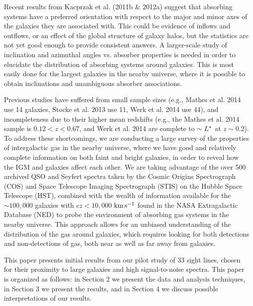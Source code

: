 \documentclass[twocolumn,tighten]{aastex6}
\begin{document}
Recent results from Kacprzak et al. (2011b $\&$ 2012a) suggest that absorbing systems have a preferred orientation with respect to the major and minor axes of the galaxies they are associated with. This could be evidence of inflows and outflows, or an effect of the global structure of galaxy halos, but the statistics are not yet good enough to provide consistent answers. A larger-scale study of inclination and azimuthal angles vs. absorber properties is needed in order to elucidate the distribution of absorbing systems around galaxies. This is most easily done for the largest galaxies in the nearby universe, where it is possible to obtain inclinations and unambiguous absorber associations. 

Previous studies have suffered from small sample sizes (e.g., Mathes et al. 2014 use 14 galaxies, Stocke et al. 2013 use 11, Werk et al. 2014 use 44), and incompleteness due to their higher mean redshifts (e.g., the Mathes et al. 2014 sample is $0.12 <z<0.67$, and Werk et al. 2014 are complete to $\sim L^{\**}$ at $z\sim0.2$). To address these shortcomings, we are conducting a large survey of the properties of intergalactic gas in the nearby universe, where we have good and relatively complete information on both faint and bright galaxies, in order to reveal how the IGM and galaxies affect each other. We are taking advantage of the over 500 archived QSO and Seyfert spectra taken by the Cosmic Origins Spectrograph (COS) and Space Telescope Imaging Spectrograph (STIS) on the Hubble Space Telescope (HST), combined with the wealth of information available for the $\sim100,000$ galaxies with $cz<10,000$ $\rm km\, s^{-1}$ found in the NASA Extragalactic Database (NED) to probe the environment of absorbing gas systems in the nearby universe. This approach allows for an unbiased understanding of the distribution of the gas around galaxies, which requires looking for both detections and non-detections of gas, both near as well as far away from galaxies.

This paper presents initial results from our pilot study of 33 sight lines, chosen for their proximity to large galaxies and high signal-to-noise spectra. This paper is organized as follows: in Section 2 we present the data and analysis techniques, in Section 3 we present the results, and in Section 4 we discuss possible interpretations of our results.
\end{document}
